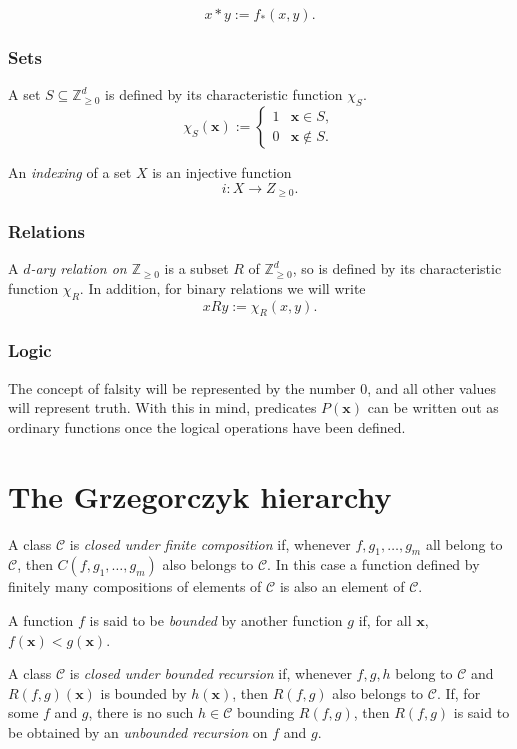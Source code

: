 \documentclass[a4paper]{article}
\newcommand{\ZZ}{\mathbb{Z}}
\newcommand{\xvec}{\mathbf{x}}	%
\newcommand{\classC}{$\mathcal{C}$}
\theoremstyle{plain}
\theoremstyle{definition}
\begin{document}
\[x \ast y := f_{\ast}(x,y). \]

\subsubsection{Sets}
A set $S \subseteq \ZZ_{\geq 0}^d$ is defined by its characteristic function $\chi_S$.
\[\chi_S(\xvec) := \begin{cases}
 1 & \xvec \in S, \\
 0 & \xvec \notin S.
 \end{cases}
\]

An {\it indexing} of a set $X$ is an injective function
\[ i : X \rightarrow Z_{\geq 0}. \]

\subsubsection{Relations}
A {\it $d$-ary relation on $\ZZ_{\geq 0}$} is
a subset $R$ of $\ZZ_{\geq 0}^d$, so is defined by its characteristic
function $\chi_R$. In addition, for binary relations we will write
\[ x R y := \chi_R(x,y). \]

\subsubsection{Logic}
The concept of falsity will be represented by the number $0$, and all other values will represent truth. With this in mind, predicates $P(\xvec)$ can be written out as ordinary functions once the logical operations have been defined.

\section{The Grzegorczyk hierarchy \label{grzegorczyk}}
A class \classC{}  is {\it closed under finite composition} if, whenever $f, g_1, \dots, g_m$ all belong to \classC{}, then $C(f,g_1, \dots, g_m)$ also belongs to \classC{}. In this case a function defined by finitely many compositions of elements of \classC{} is also an element of \classC{}.

A function $f$ is said to be {\it bounded} by another function $g$ if, for all $\xvec$, $f(\xvec) < g(\xvec)$.

A class \classC{} is {\it closed under bounded recursion} if, whenever $f,g,h$ belong to \classC{} and $R(f,g)(\xvec)$ is bounded by $h(\xvec)$, then $R(f,g)$ also belongs to \classC{}. If, for some $f$ and $g$, there is no such $h \in \mathcal{C}$ bounding $R(f,g)$, then $R(f,g)$ is said to be obtained by an {\it unbounded recursion} on $f$ and $g$.
\end{document}
